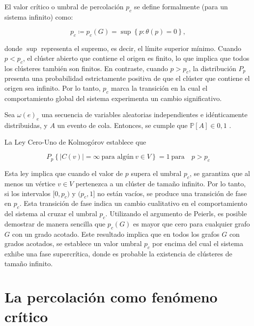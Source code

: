 El valor crítico o umbral de percolación $p_c$ se define formalmente (para un sistema infinito) como:

\begin{equation}\label{eq:3}
p_c \coloneqq p_c( G) = \sup\left\{p:\theta(p)=0\right\},
\end{equation}


donde $\sup$ representa el supremo, es decir, el límite superior mínimo. Cuando $p < p_c$, el clúster abierto que contiene el origen es finito, lo que implica que todos los clústeres también son finitos. En contraste, cuando $p > p_c$, la distribución $P_p$ presenta una probabilidad estrictamente positiva de que el clúster que contiene el origen sea infinito. Por lo tanto, $p_c$ marca la transición en la cual el comportamiento global del sistema experimenta un cambio significativo.



\begin{theorem}[Ley Cero-Uno de Kolmogórov] %
	Sea $\omega(e)_e$  una secuencia de variables aleatorias independientes e idénticamente distribuidas, y $A$ un evento de cola. Entonces, se cumple que $\mathbb{P}[A] \in {0, 1}$ .
\end{theorem}

La Ley Cero-Uno de Kolmogórov establece que 

\begin{equation}\label{eq:4}
P_p\left\{\left| C(v)\right| =\infty \ \text{para algún} \ v \in  V  \right\} = 1 \ \text{para} \quad p>p_c
\end{equation}

Esta ley implica que cuando el valor de $p$ supera el umbral $p_c$, se garantiza que al menos un vértice $v \in V$ pertenezca a un clúster de tamaño infinito.
Por lo tanto, si los intervalos $[0, p_c)$ y $(p_c, 1]$ no están vacíos, se produce una transición de fase en $p_c$. Esta transición de fase indica un cambio cualitativo en el comportamiento del sistema al cruzar el umbral $p_c$.  Utilizando el argumento de Peierls, es posible demostrar de manera sencilla que $p_c(G )$ es mayor que cero para cualquier grafo $G$ con un grado acotado. Este resultado implica que en todos los grafos $G$  con grados acotados, se establece un valor umbral $p_c$ por encima del cual el sistema exhibe una fase supercrítica, donde es probable la existencia de clústeres de tamaño infinito.


\section{La percolación como fenómeno crítico}\label{sec:percolacion_critico}


